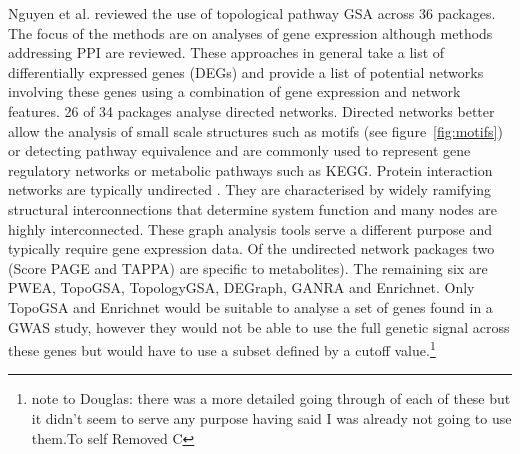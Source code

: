   Nguyen et al.\cite{nguyen2018network} reviewed the use of topological pathway GSA across 36 packages.
The focus of the methods are on analyses of gene expression although methods addressing PPI are reviewed. These approaches in general take a list of differentially expressed genes (DEGs) and provide a list of potential networks involving these genes using a combination of gene expression and network features. 
26 of 34 packages analyse directed networks. Directed networks better allow the analysis of small scale structures such as motifs (see figure~\ref{fig:motifs})  or detecting pathway equivalence and are commonly used to represent gene regulatory networks or metabolic pathways such as KEGG\cite{kanehisa2000kegg}.  Protein interaction networks are typically undirected \cite{newman2018networks}. They are characterised by widely ramifying structural interconnections that determine system function and many nodes are highly interconnected. These graph analysis tools serve a different purpose and typically require gene expression data. Of the undirected network packages two (Score PAGE and TAPPA) are specific to metabolites). The remaining six are PWEA, TopoGSA, TopologyGSA, DEGraph, GANRA and Enrichnet. Only TopoGSA and Enrichnet would be suitable to analyse a set of genes found in a GWAS study, however they would not be able to use the full genetic signal across these genes but would have to use a subset defined by a cutoff value.\footnote{note to Douglas: there was a more detailed going through of each of these but it didn't seem to serve any purpose having said I was already not going to use them.To self Removed C}



